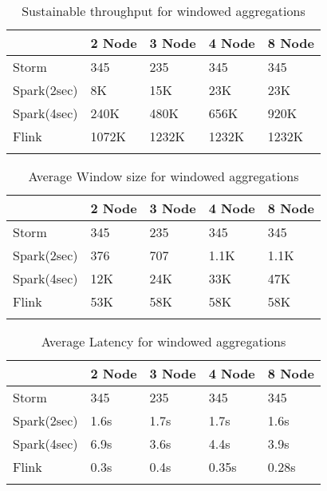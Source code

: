     \begin{table}
        \begin{tabular}{lllll}\toprule
            &\textbf{2 Node} & \textbf{3 Node} & \textbf{4 Node} & \textbf{8 Node}\\\midrule
            Storm & 345 & 235 & 345 & 345\\
            Spark(2sec) & 8K & 15K & 23K & 23K\\
            Spark(4sec) & 240K & 480K & 656K & 920K\\
            Flink & 1072K & 1232K & 1232K & 1232K\\
            \\\bottomrule
        \end{tabular}
        \caption{Sustainable throughput for windowed aggregations}\label{Tab1}
    \end{table} 

    \begin{table}
        \begin{tabular}{lllll}\toprule
            &\textbf{2 Node} & \textbf{3 Node} & \textbf{4 Node} & \textbf{8 Node}\\\midrule
            Storm & 345 & 235 & 345 & 345\\
            Spark(2sec) & 376 & 707 & 1.1K & 1.1K\\
            Spark(4sec) & 12K & 24K & 33K & 47K\\
            Flink & 53K & 58K & 58K & 58K\\
            \\\bottomrule
        \end{tabular}
        \caption{Average Window size for windowed aggregations}\label{Tab1}
    \end{table} 

    \begin{table}
        \begin{tabular}{lllll}\toprule
            &\textbf{2 Node} & \textbf{3 Node} & \textbf{4 Node} & \textbf{8 Node}\\\midrule
            Storm & 345 & 235 & 345 & 345\\
            Spark(2sec) & 1.6s & 1.7s & 1.7s & 1.6s\\
            Spark(4sec) & 6.9s & 3.6s & 4.4s & 3.9s\\
            Flink & 0.3s & 0.4s & 0.35s & 0.28s\\
            \\\bottomrule
        \end{tabular}
        \caption{Average Latency for windowed aggregations}\label{Tab1}
    \end{table} 


